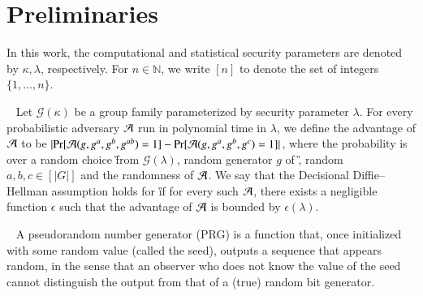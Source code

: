 \section{Preliminaries}


In this work, the computational and statistical security parameters are denoted by $\kappa, \lambda$, respectively. For $n \in \mathbb{N}$, we write $[n]$ to denote the set of integers $\{1, \ldots, n\}$. %


\label{subs:crypto_prelim}

	\begin{definition}~\cite{Diffie:2006:NDC:2263321.2269104}
		Let $\mathcal{G}(\kappa)$ be a group family parameterized by security parameter $\lambda$. For every probabilistic adversary $\mathcal{A}$ run in polynomial time in $\lambda$, we define the advantage of $\mathcal{A}$ to be
		$\lvert\Pr[\mathcal{A}(g,g^a,g^b,g^{ab})=1]-\Pr[\mathcal{A}(g,g^a,g^b,g^c)=1]\rvert$, where the probability is over a random choice \G from $\mathcal{G}(\lambda)$, random generator $g$ of \G, random $a, b, c \in [|G|]$ and the randomness of $\mathcal{A}$. We say that the Decisional Diffie–Hellman assumption holds for \G if for every such $\mathcal{A}$, there exists a negligible function $\epsilon$ such that the advantage of $\mathcal{A}$ is bounded by $\epsilon(\lambda)$.
	\end{definition}

\begin{definition}~\cite{Koeune2011} A pseudorandom number generator (PRG) is a function that, once initialized with some random value (called the seed), outputs a sequence that appears random, in the sense that an observer who does not know the value of the seed cannot distinguish the output from that of a (true) random bit generator.
\end{definition}

